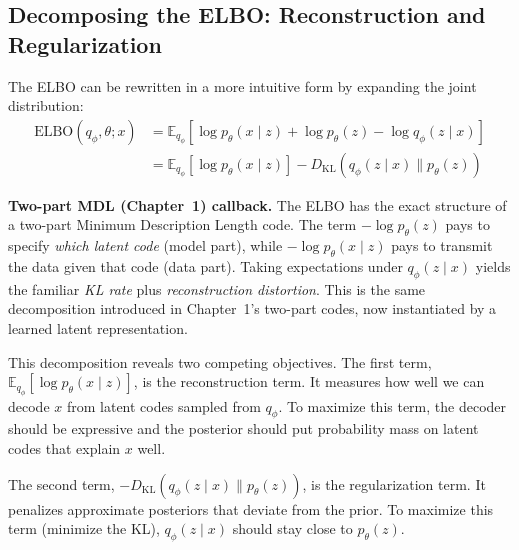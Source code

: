 \vspace{1.5em}

\subsection{Decomposing the ELBO: Reconstruction and Regularization}

The ELBO can be rewritten in a more intuitive form by expanding the joint distribution:
%
\begin{align}
\text{ELBO}(q_\phi, \theta; x)
&= \mathbb{E}_{q_\phi} \left[ \log p_\theta(x \mid z) + \log p_\theta(z) - \log q_\phi(z \mid x) \right] \\
&= \mathbb{E}_{q_\phi} \left[ \log p_\theta(x \mid z) \right] - D_{\text{KL}}(q_\phi(z \mid x) \| p_\theta(z))
\end{align}

\begin{keyinsight}
\textbf{Two-part MDL (Chapter~1) callback.} The ELBO has the exact structure of a two-part Minimum Description Length code. The term $-\log p_\theta(z)$ pays to specify \emph{which latent code} (model part), while $-\log p_\theta(x\mid z)$ pays to transmit the data given that code (data part). Taking expectations under $q_\phi(z\mid x)$ yields the familiar \emph{KL rate} plus \emph{reconstruction distortion}. This is the same decomposition introduced in Chapter~1's two-part codes, now instantiated by a learned latent representation.
\end{keyinsight}

\vspace{0.3cm}


\vspace{0.3cm}

This decomposition reveals two competing objectives. The first term, $\mathbb{E}_{q_\phi}[\log p_\theta(x \mid z)]$, is the reconstruction term. It measures how well we can decode $x$ from latent codes sampled from $q_\phi$. To maximize this term, the decoder should be expressive and the posterior should put probability mass on latent codes that explain $x$ well.

\vspace{0.3cm}

The second term, $-D_{\text{KL}}(q_\phi(z \mid x) \| p_\theta(z))$, is the regularization term. It penalizes approximate posteriors that deviate from the prior. To maximize this term (minimize the KL), $q_\phi(z \mid x)$ should stay close to $p_\theta(z)$.

\vspace{0.3cm}

